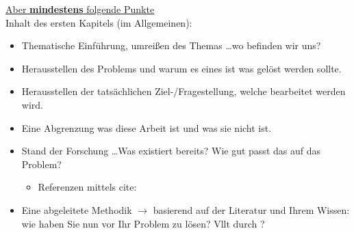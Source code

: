 \underline{Aber \textbf{mindestens} folgende Punkte}\\
Inhalt des ersten Kapitels (im Allgemeinen):
\begin{itemize}
    \item Thematische Einführung, umreißen des Themas \dots wo befinden wir uns?
    \item Herausstellen des Problems und warum es eines ist was gelöst werden sollte.
    \item Herausstellen der tatsächlichen Ziel-/Fragestellung, welche bearbeitet werden wird.
    \item Eine Abgrenzung was diese Arbeit ist und was sie nicht ist.
    \item Stand der Forschung \dots Was existiert bereits? Wie gut passt das auf das Problem?
    \begin{itemize}
        \item Referenzen mittels cite: \cite[S.~111]{jsch2011} \cite[S.~27f]{Tane2014}
    \end{itemize}
    \item Eine abgeleitete Methodik $\rightarrow$ basierend auf der Literatur und Ihrem Wissen: wie haben Sie nun vor Ihr Problem zu lösen? Vllt durch \cite{9429985}?
\end{itemize}



